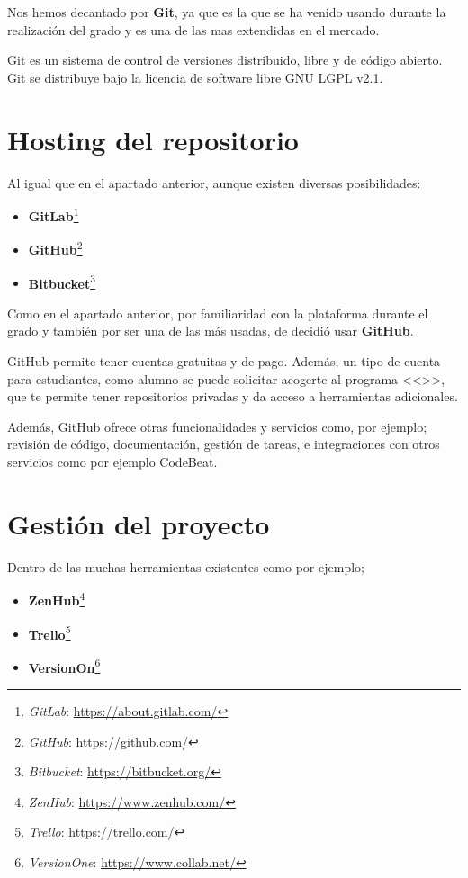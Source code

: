 Nos hemos decantado por \textbf {Git}, ya que es la que se ha venido usando durante la realización del grado y es una de las mas extendidas en el mercado.

Git es un sistema de control de versiones distribuido, libre y de código abierto. Git se distribuye bajo la licencia de software libre GNU LGPL v2.1. 

\section{Hosting del repositorio}

Al igual que en el apartado anterior, aunque existen diversas posibilidades:
\begin{itemize}
\item \textbf{GitLab}\footnote{\textsl{GitLab}: \url{https://about.gitlab.com/}}
\item \textbf{GitHub}\footnote{\textsl{GitHub}: \url{https://github.com/}}
\item \textbf{Bitbucket}\footnote{\textsl{Bitbucket}: \url{https://bitbucket.org/}}
\end{itemize}

Como en el apartado anterior, por familiaridad con la plataforma durante el grado y también por ser una de las más usadas, de decidió usar \textbf {GitHub}.

GitHub permite tener cuentas gratuitas y de pago. Además, un tipo de cuenta para estudiantes, como alumno se puede solicitar acogerte al programa <<>>, que te permite tener repositorios privadas y da acceso a herramientas adicionales.

Además, GitHub ofrece otras funcionalidades y servicios como, por ejemplo; revisión de código, documentación, gestión de tareas,  e integraciones con otros servicios como por ejemplo CodeBeat.

\section{Gestión del proyecto}

Dentro de las muchas herramientas existentes como por ejemplo;
\begin{itemize}
\item \textbf{ZenHub}\footnote{\textsl{ZenHub}: \url{https://www.zenhub.com/}}
\item \textbf{Trello}\footnote{\textsl{Trello}: \url{https://trello.com/}}
\item \textbf{VersionOn}\footnote{\textsl{VersionOne}: \url{https://www.collab.net/}}
\end{itemize}

